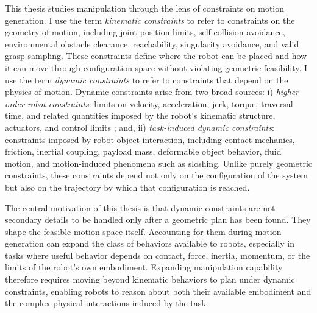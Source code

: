 
This thesis studies manipulation through the lens of constraints on motion generation.
I use the term \textit{kinematic constraints} to refer to constraints on the geometry of motion, including joint position limits, self-collision avoidance, environmental obstacle clearance, reachability, singularity avoidance, and valid grasp sampling.
These constraints define where the robot can be placed and how it can move through configuration space without violating geometric feasibility.
I use the term \textit{dynamic constraints} to refer to constraints that depend on the physics of motion.
Dynamic constraints arise from two broad sources: i) \textit{higher-order robot constraints}: limits on velocity, acceleration, jerk, torque, traversal time, and related quantities imposed by the robot's kinematic structure, actuators, and control limits \cite{pham2018new,berscheid2021jerk}; and, ii) \textit{task-induced dynamic constraints}: constraints imposed by robot-object interaction, including contact mechanics, friction, inertial coupling, payload mass, deformable object behavior, fluid motion, and motion-induced phenomena such as sloshing.
Unlike purely geometric constraints, these constraints depend not only on the configuration of the system but also on the trajectory by which that configuration is reached.

The central motivation of this thesis is that dynamic constraints are not secondary details to be handled only after a geometric plan has been found.
They shape the feasible motion space itself.
Accounting for them during motion generation can expand the class of behaviors available to robots, especially in tasks where useful behavior depends on contact, force, inertia, momentum, or the limits of the robot's own embodiment.
Expanding manipulation capability therefore requires moving beyond kinematic behaviors to plan under dynamic constraints, enabling robots to reason about both their available embodiment and the complex physical interactions induced by the task.


